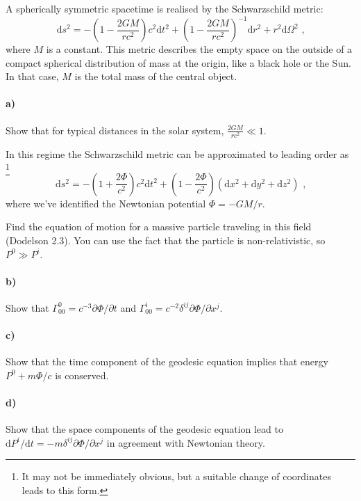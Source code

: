 \documentclass[12pt]{article}
\newcommand\diff{\mathrm{d}}
\begin{document}
A spherically symmetric spacetime is realised by the Schwarzschild metric:
\begin{equation}
    \diff s^2 = - \left(1 - \frac{2 G M}{r c^2}\right) c^2 \diff t^2
    + \left(1 - \frac{2 G M}{r c^2}\right)^{-1} \diff r^2
    + r^2 \diff \Omega^2 \text{ ,}
\label{eq:schwarz}
\end{equation}
where $M$ is a constant. This metric describes the empty space on the outside of
a compact spherical distribution of mass at the origin, like a black hole or the
Sun. In that case, $M$ is the total mass of the central object.

\paragraph{a)} Show that for typical distances in the solar system, $\frac{2 G
M}{r c^2} \ll 1$.

In this regime the Schwarzschild metric can be approximated to leading order as
\footnote{It may not be immediately obvious, but a suitable change of coordinates leads to this form.}
\begin{equation}
    \diff s^2 = - \left(1 + \frac{2 \Phi}{c^2}\right) c^2 \diff t^2
    + \left(1 - \frac{2 \Phi}{c^2}\right)
    (\diff x^2 + \diff y^2 + \diff z^2) \text{ ,}
\label{eq:schwarz_pert}
\end{equation}
where we've identified the Newtonian potential $\Phi = -GM/r$.

Find the equation of motion for a massive particle traveling in this field
(Dodelson 2.3). You can use the fact that the particle is non-relativistic, so
$P^0 \gg P^i$.

\paragraph{b)} Show that $\Gamma^0_{00} = c^{-3} \partial \Phi / \partial t$ and
$\Gamma^i_{00} = c^{-2} \delta^{ij} \partial \Phi / \partial x^j$.

\paragraph{c)} Show that the time component of the geodesic equation implies
that energy $P^0 + m \Phi / c$ is conserved.

\paragraph{d)} Show that the space components of the geodesic equation lead to
$\diff P^i / \diff t = - m \delta^{ij} \partial \Phi / \partial x^j$ in
agreement with Newtonian theory.
\end{document}
